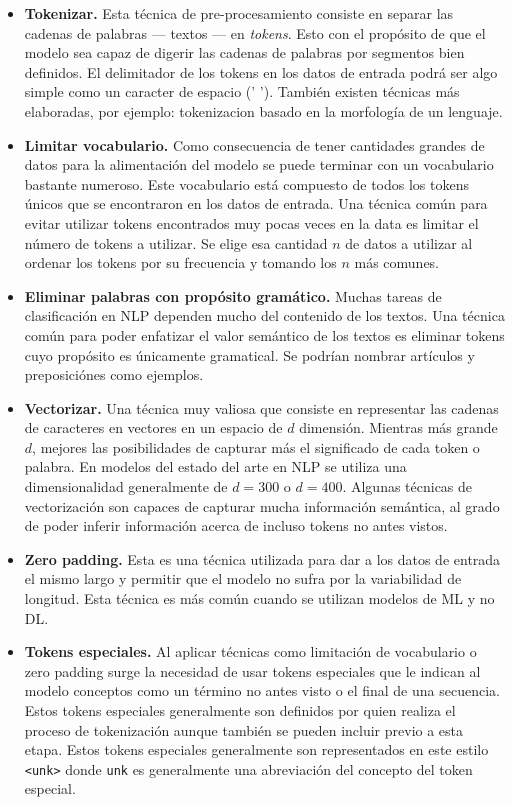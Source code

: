 \begin{itemize}
\item \textbf{Tokenizar.} Esta técnica de pre-procesamiento consiste en separar las cadenas de palabras --- textos --- en \emph{tokens}. Esto con el propósito de que el modelo sea capaz de digerir las cadenas de palabras por segmentos bien definidos. El delimitador de los tokens en los datos de entrada podrá ser algo simple como un caracter de espacio (' '). También existen técnicas más elaboradas, por ejemplo: \gls{tokenizacion} basado en la morfología de un lenguaje.
\item \textbf{Limitar \gls{vocabulario}.} Como consecuencia de tener cantidades grandes de datos para la alimentación del modelo se puede terminar con un vocabulario bastante numeroso. Este vocabulario está compuesto de todos los tokens únicos que se encontraron en los datos de entrada. Una técnica común para evitar utilizar tokens encontrados muy pocas veces en la data es limitar el número de tokens a utilizar. Se elige esa cantidad $n$ de datos a utilizar al ordenar los tokens por su frecuencia y tomando los $n$ más comunes.
\item \textbf{Eliminar palabras con propósito gramático.} Muchas tareas de clasificación en NLP dependen mucho del contenido de los textos. Una técnica común para poder enfatizar el valor semántico de los textos es eliminar tokens cuyo propósito es únicamente gramatical. Se podrían nombrar artículos y preposiciónes como ejemplos.
\item \textbf{Vectorizar.} Una técnica muy valiosa que consiste en representar las cadenas de caracteres en vectores en un espacio de $d$ dimensión. Mientras más grande $d$, mejores las posibilidades de capturar más el significado de cada token o palabra. En modelos del estado del arte en NLP se utiliza una dimensionalidad generalmente de $d = 300$ o $d = 400$. Algunas técnicas de vectorización son capaces de capturar mucha información semántica, al grado de poder inferir información acerca de incluso tokens no antes vistos.
\item \textbf{Zero padding.} Esta es una técnica utilizada para dar a los datos de entrada el mismo largo y permitir que el modelo no sufra por la variabilidad de longitud. Esta técnica es más común cuando se utilizan modelos de ML y no DL.
\item \textbf{Tokens especiales.} Al aplicar técnicas como limitación de vocabulario o zero padding surge la necesidad de usar tokens especiales que le indican al modelo conceptos como un término no antes visto o el final de una secuencia. Estos tokens especiales generalmente son definidos por quien realiza el proceso de tokenización aunque también se pueden incluir previo a esta etapa. Estos tokens especiales generalmente son representados en este estilo \texttt{<unk>} donde \texttt{unk} es generalmente una abreviación del concepto del token especial. 
\end{itemize}

